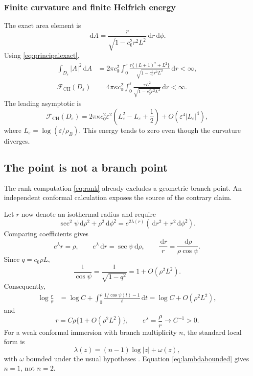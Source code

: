 \documentclass[preprint,amsmath,amssymb,aps,prl,superscriptaddress,nofootinbib,floatfix]{revtex4-2}
\newcommand{\dd}{\,\mathrm d}
\newcommand{\CH}{\mathrm{CH}}
\begin{document}
\subsubsection{Finite curvature and finite Helfrich energy}
The exact area element is
\[
\dd A=\frac{r}{\sqrt{1-c_0^2r^2L^2}}\dd r\dd\phi.
\]
Using \eqref{eq:principalexact},
\begin{align}
\int_{D_\varepsilon}|A|^2\dd A
&=2\pi c_0^2\int_0^\varepsilon\frac{r\{(L+1)^2+L^2\}}{\sqrt{1-c_0^2r^2L^2}}\dd r<\infty,\label{eq:Atotal}\\
\mathcal F_{\CH}(D_\varepsilon)
&=4\pi\kappa c_0^2\int_0^\varepsilon\frac{rL^2}{\sqrt{1-c_0^2r^2L^2}}\dd r<\infty.\label{eq:energylocal}
\end{align}
The leading asymptotic is
\begin{equation}
\mathcal F_{\CH}(D_\varepsilon)=2\pi\kappa c_0^2\varepsilon^2\left(L_\varepsilon^2-L_\varepsilon+\frac12\right)+O(\varepsilon^4|L_\varepsilon|^4),\label{eq:energyasymptotic}
\end{equation}
where \(L_\varepsilon=\log(\varepsilon/\rho_B)\). This energy tends to zero even though the curvature diverges.

\subsection{The point is not a branch point}\label{sec:nobranch}
The rank computation \eqref{eq:rank} already excludes a geometric branch point. An independent conformal calculation exposes the source of the contrary claim.

Let \(r\) now denote an isothermal radius and require
\begin{equation}
\sec^2\psi\dd\rho^2+\rho^2\dd\phi^2=e^{2\lambda(r)}(\dd r^2+r^2\dd\phi^2).\label{eq:isothermal}
\end{equation}
Comparing coefficients gives
\begin{equation}
e^\lambda r=\rho,\qquad e^\lambda\dd r=\sec\psi\dd\rho,\qquad\frac{\dd r}{r}=\frac{\dd\rho}{\rho\cos\psi}.\label{eq:riso}
\end{equation}
Since \(q=c_0\rho L\),
\begin{equation}
\frac1{\cos\psi}=\frac1{\sqrt{1-q^2}}=1+O(\rho^2L^2).\label{eq:cosinv}
\end{equation}
Consequently,
\begin{align}
\log\frac r\rho&=\log C+\int_0^\rho\frac{1/\cos\psi(t)-1}{t}\dd t=\log C+O(\rho^2L^2),\label{eq:rhoratio}
\end{align}
and
\begin{equation}
r=C\rho\{1+O(\rho^2L^2)\},\qquad e^\lambda=\frac\rho r\longrightarrow C^{-1}>0.\label{eq:lambdabounded}
\end{equation}
For a weak conformal immersion with branch multiplicity \(n\), the standard local form is
\begin{equation}
\lambda(z)=(n-1)\log|z|+\omega(z),\label{eq:branchform}
\end{equation}
with \(\omega\) bounded under the usual hypotheses \cite{MondinoScharrer2020,Riviere2008,BernardRiviere2013}. Equation \eqref{eq:lambdabounded} gives \(n=1\), not \(n=2\).
\end{document}
